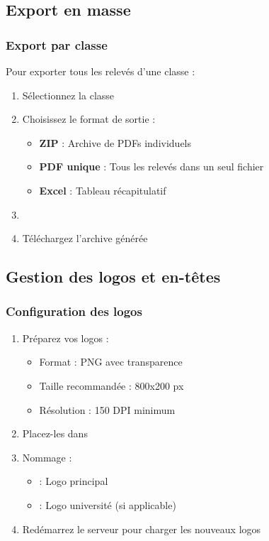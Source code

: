 \subsection{Export en masse}

\subsubsection{Export par classe}

Pour exporter tous les relevés d'une classe :
\begin{enumerate}[leftmargin=*]
    \item Sélectionnez la classe
    \item Choisissez le format de sortie :
    \begin{itemize}
        \item \textbf{ZIP} : Archive de PDFs individuels
        \item \textbf{PDF unique} : Tous les relevés dans un seul fichier
        \item \textbf{Excel} : Tableau récapitulatif
    \end{itemize}
    \item {}
    \item Téléchargez l'archive générée
\end{enumerate}

\subsection{Gestion des logos et en-têtes}

\subsubsection{Configuration des logos}

\begin{enumerate}[leftmargin=*]
    \item Préparez vos logos :
    \begin{itemize}
        \item Format : PNG avec transparence
        \item Taille recommandée : 800x200 px
        \item Résolution : 150 DPI minimum
    \end{itemize}
    \item Placez-les dans 
    \item Nommage :
    \begin{itemize}
        \item {} : Logo principal
        \item {} : Logo université (si applicable)
    \end{itemize}
    \item Redémarrez le serveur pour charger les nouveaux logos
\end{enumerate}

